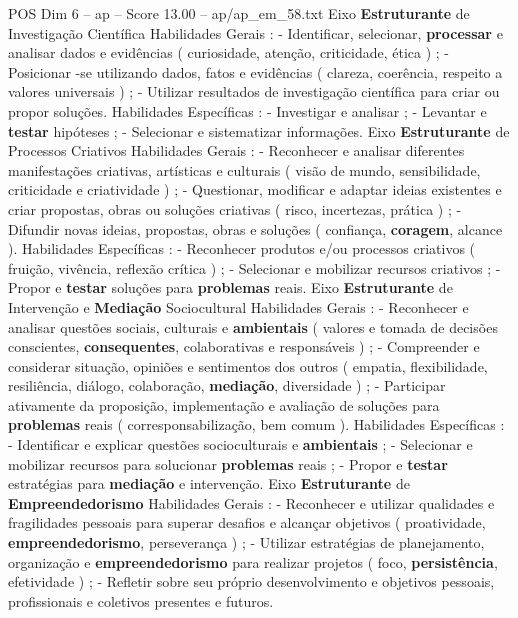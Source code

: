 \begin{textsample}{POS Dim 6 – ap – Score 13.00 – ap/ap\_em\_58.txt}  \label{ex:f6_pos_103}
Eixo \textbf{Estruturante} de Investigação Científica Habilidades Gerais : - Identificar, selecionar, \textbf{processar} e analisar dados e evidências ( curiosidade, atenção, criticidade, ética ) ; - Posicionar -se utilizando dados, fatos e evidências ( clareza, coerência, respeito a valores universais ) ; - Utilizar resultados de investigação científica para criar ou propor soluções.
Habilidades Específicas : - Investigar e analisar ; - Levantar e \textbf{testar} hipóteses ; - Selecionar e sistematizar informações.
Eixo \textbf{Estruturante} de Processos Criativos Habilidades Gerais : - Reconhecer e analisar diferentes manifestações criativas, artísticas e culturais ( visão de mundo, sensibilidade, criticidade e criatividade ) ; - Questionar, modificar e adaptar ideias existentes e criar propostas, obras ou soluções criativas ( risco, incertezas, prática ) ; - Difundir novas ideias, propostas, obras e soluções ( confiança, \textbf{coragem}, alcance ).
Habilidades Específicas : - Reconhecer produtos e/ou processos criativos ( fruição, vivência, reflexão crítica ) ; - Selecionar e mobilizar recursos criativos ; - Propor e \textbf{testar} soluções para \textbf{problemas} reais.
Eixo \textbf{Estruturante} de Intervenção e \textbf{Mediação} Sociocultural Habilidades Gerais : - Reconhecer e analisar questões sociais, culturais e \textbf{ambientais} ( valores e tomada de decisões conscientes, \textbf{consequentes}, colaborativas e responsáveis ) ; - Compreender e considerar situação, opiniões e sentimentos dos outros ( empatia, flexibilidade, resiliência, diálogo, colaboração, \textbf{mediação}, diversidade ) ; - Participar ativamente da proposição, implementação e avaliação de soluções para \textbf{problemas} reais ( corresponsabilização, bem comum ).
Habilidades Específicas : - Identificar e explicar questões socioculturais e \textbf{ambientais} ; - Selecionar e mobilizar recursos para solucionar \textbf{problemas} reais ; - Propor e \textbf{testar} estratégias para \textbf{mediação} e intervenção.
Eixo \textbf{Estruturante} de \textbf{Empreendedorismo} Habilidades Gerais : - Reconhecer e utilizar qualidades e fragilidades pessoais para superar desafios e alcançar objetivos ( proatividade, \textbf{empreendedorismo}, perseverança ) ; - Utilizar estratégias de planejamento, organização e \textbf{empreendedorismo} para realizar projetos ( foco, \textbf{persistência}, efetividade ) ; - Refletir sobre seu próprio desenvolvimento e objetivos pessoais, profissionais e coletivos presentes e futuros.

\end{textsample}
